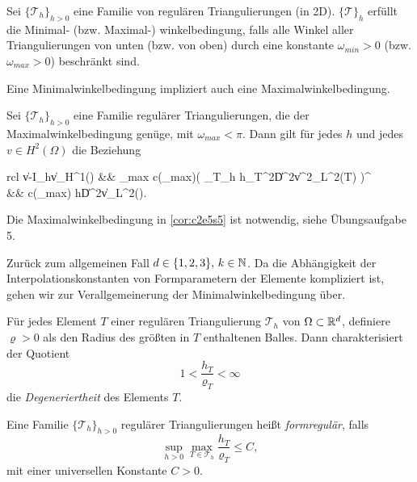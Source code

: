 \documentclass[../skript.tex]{subfiles}
\begin{document}
\begin{definition}\label{def:c2e5s3}
	Sei $\{\mathcal{T}_h\}_{h>0}$ eine Familie von regulären Triangulierungen (in 2D). $\{\mathcal{T}\}_h$ erfüllt die Minimal- (bzw. Maximal-) winkelbedingung, falls alle Winkel aller Triangulierungen von unten (bzw. von oben) durch eine konstante $\omega_{min}>0$ (bzw. $\omega_{max}>0$) beschränkt sind. 
\end{definition}
\begin{remark}\label{rem:c2e5s4}
	Eine Minimalwinkelbedingung impliziert auch eine Maximalwinkelbedingung.
\end{remark}

\begin{corollary}\label{cor:c2e5s5}
	Sei $\{\mathcal{T}_h\}_{h>0}$ eine Familie regulärer Triangulierungen, die der Maximalwinkelbedingung genüge, mit $\omega_{max}<\pi$. Dann gilt für jedes $h$ und jedes $v\in H^2(\Omega)$ die Beziehung
	\begin{IEEEeqnarray}{rcl}
		\|v-I_hv\|_{H^1(\Omega)} &\leq& \omega_{max} c(\omega_{max})\left( \sum_{T\in{}_h} h_T^2\|D^2v\|^2_{L^2(T)} \right)^{} \\
		&\leq& c(\omega_{max}) h\|D^2v\|_{L^2(\Omega)}.
	\end{IEEEeqnarray}
\end{corollary}
\begin{remark}\label{rem:c2e5s6}
	Die Maximalwinkelbedingung in \cref{cor:c2e5s5} ist notwendig, siehe Übungsaufgabe 5.
\end{remark}
Zurück zum allgemeinen Fall $d\in\{1,2,3\},\,k\in\mathbb{N}$. Da die Abhängigkeit der Interpolationskonstanten von Formparametern der Elemente kompliziert ist, gehen wir zur Verallgemeinerung der Minimalwinkelbedingung über.
\begin{definition}\label{def:c2e5s7}
	Für jedes Element $T$ einer regulären Triangulierung $\mathcal{T}_h$ von $\Omega\subset\mathbb{R}^d$, definiere $\varrho>0$ als den Radius des größten in $T$ enthaltenen Balles. Dann charakterisiert der Quotient
	\[
		1 < \frac{h_T}{\varrho_T} < \infty
	\]
	die \emph{Degeneriertheit} des Elements $T$. \par
	Eine Familie $\{\mathcal{T}_h\}_{h>0}$ regulärer Triangulierungen heißt \emph{formregulär}, falls
	\[
		\sup_{h>0}\max_{T\in\mathcal{T}_h} \frac{h_T}{\varrho_T}\leq C,
	\]
	mit einer universellen Konstante $C>0$.
\end{definition}
\end{document}
